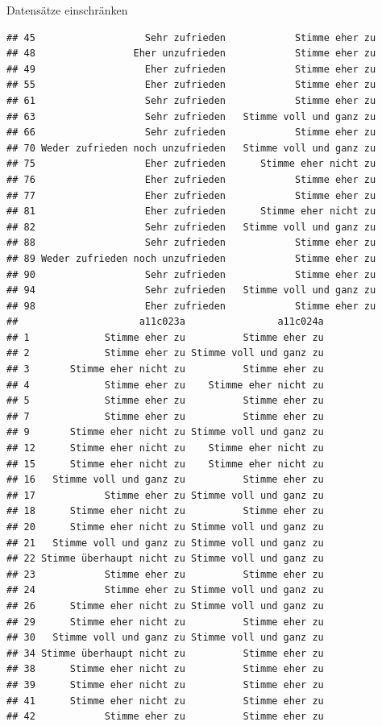 \documentclass[ignorenonframetext,]{beamer}
\begin{document}
\begin{frame}[fragile]{Datensätze einschränken}
\begin{verbatim}
## 45                   Sehr zufrieden            Stimme eher zu
## 48                 Eher unzufrieden            Stimme eher zu
## 49                   Eher zufrieden            Stimme eher zu
## 55                   Eher zufrieden            Stimme eher zu
## 61                   Sehr zufrieden            Stimme eher zu
## 63                   Sehr zufrieden   Stimme voll und ganz zu
## 66                   Sehr zufrieden            Stimme eher zu
## 70 Weder zufrieden noch unzufrieden   Stimme voll und ganz zu
## 75                   Eher zufrieden      Stimme eher nicht zu
## 76                   Eher zufrieden            Stimme eher zu
## 77                   Eher zufrieden            Stimme eher zu
## 81                   Eher zufrieden      Stimme eher nicht zu
## 82                   Sehr zufrieden   Stimme voll und ganz zu
## 88                   Sehr zufrieden            Stimme eher zu
## 89 Weder zufrieden noch unzufrieden            Stimme eher zu
## 90                   Sehr zufrieden            Stimme eher zu
## 94                   Sehr zufrieden   Stimme voll und ganz zu
## 98                   Eher zufrieden            Stimme eher zu
##                     a11c023a                a11c024a
## 1             Stimme eher zu          Stimme eher zu
## 2             Stimme eher zu Stimme voll und ganz zu
## 3       Stimme eher nicht zu          Stimme eher zu
## 4             Stimme eher zu    Stimme eher nicht zu
## 5             Stimme eher zu          Stimme eher zu
## 7             Stimme eher zu          Stimme eher zu
## 9       Stimme eher nicht zu Stimme voll und ganz zu
## 12      Stimme eher nicht zu    Stimme eher nicht zu
## 15      Stimme eher nicht zu    Stimme eher nicht zu
## 16   Stimme voll und ganz zu          Stimme eher zu
## 17            Stimme eher zu Stimme voll und ganz zu
## 18      Stimme eher nicht zu          Stimme eher zu
## 20      Stimme eher nicht zu Stimme voll und ganz zu
## 21   Stimme voll und ganz zu Stimme voll und ganz zu
## 22 Stimme überhaupt nicht zu Stimme voll und ganz zu
## 23            Stimme eher zu          Stimme eher zu
## 24            Stimme eher zu Stimme voll und ganz zu
## 26      Stimme eher nicht zu Stimme voll und ganz zu
## 29      Stimme eher nicht zu          Stimme eher zu
## 30   Stimme voll und ganz zu Stimme voll und ganz zu
## 34 Stimme überhaupt nicht zu          Stimme eher zu
## 38      Stimme eher nicht zu          Stimme eher zu
## 39      Stimme eher nicht zu          Stimme eher zu
## 41      Stimme eher nicht zu          Stimme eher zu
## 42            Stimme eher zu          Stimme eher zu

\end{verbatim}
\end{frame}
\end{document}
